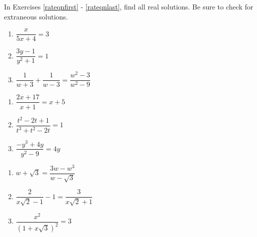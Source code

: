 \documentclass[11pt]{article}
\theoremstyle{definition}  %
\newcounter{HW}
\begin{document}
\vspace{-0.15in}

In Exercises \ref{rateqnfirst} - \ref{rateqnlast}, find all real solutions.  Be sure to check for extraneous solutions.

\begin{multicols}{3}
\begin{enumerate}
\setcounter{enumi}{\value{HW}}

\item $\dfrac{x}{5x + 4} = 3$ \label{rateqnfirst}
\item $\dfrac{3y - 1}{y^{2} + 1} = 1$
\item $\dfrac{1}{w + 3} + \dfrac{1}{w - 3} = \dfrac{w^{2} - 3}{w^{2} - 9}$

\setcounter{HW}{\value{enumi}}
\end{enumerate}
\end{multicols}

\begin{multicols}{3}
\begin{enumerate}
\setcounter{enumi}{\value{HW}}


\item $\dfrac{2x + 17}{x + 1} = x + 5$
\item $\dfrac{t^{2} - 2t + 1}{t^{3} + t^{2} - 2t} = 1$
\item $\dfrac{-y^{3} + 4y}{y^{2} - 9} = 4y$  

\setcounter{HW}{\value{enumi}}
\end{enumerate}
\end{multicols}

\begin{multicols}{3}
\begin{enumerate}
\setcounter{enumi}{\value{HW}}


\item $w + \sqrt{3} = \dfrac{3w - w^3}{w - \sqrt{3}}$
\item $\dfrac{2}{x\sqrt{2} - 1}  - 1 = \dfrac{3}{x \sqrt{2} + 1}$
\item $\dfrac{x^2}{(1 + x\sqrt{3})^2} = 3$ \label{rateqnlast}

\setcounter{HW}{\value{enumi}}
\end{enumerate}
\end{multicols}
\end{document}
